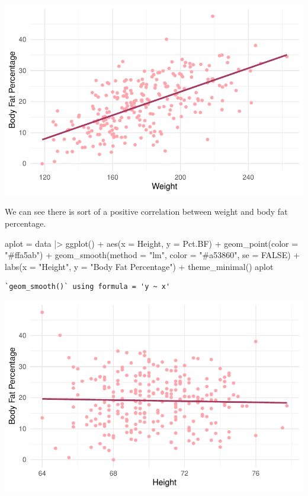\documentclass[
  letterpaper,
  DIV=11,
  numbers=noendperiod]{scrartcl}
\newenvironment{Shaded}{\begin{snugshade}}{\end{snugshade}}
\newcommand{\AttributeTok}[1]{\textcolor[rgb]{0.40,0.45,0.13}{#1}}
\newcommand{\ConstantTok}[1]{\textcolor[rgb]{0.56,0.35,0.01}{#1}}
\newcommand{\FunctionTok}[1]{\textcolor[rgb]{0.28,0.35,0.67}{#1}}
\newcommand{\NormalTok}[1]{\textcolor[rgb]{0.00,0.23,0.31}{#1}}
\newcommand{\OtherTok}[1]{\textcolor[rgb]{0.00,0.23,0.31}{#1}}
\newcommand{\SpecialCharTok}[1]{\textcolor[rgb]{0.37,0.37,0.37}{#1}}
\newcommand{\StringTok}[1]{\textcolor[rgb]{0.13,0.47,0.30}{#1}}
\begin{document}
\includegraphics{Untitled_files/figure-pdf/unnamed-chunk-6-1.pdf}

We can see there is sort of a positive correlation between weight and
body fat percentage.

\begin{Shaded}
\begin{Highlighting}[]
\NormalTok{aplot }\OtherTok{=}\NormalTok{ data }\SpecialCharTok{|\textgreater{}}
  \FunctionTok{ggplot}\NormalTok{() }\SpecialCharTok{+} \FunctionTok{aes}\NormalTok{(}\AttributeTok{x =}\NormalTok{ Height, }\AttributeTok{y =}\NormalTok{ Pct.BF) }\SpecialCharTok{+}
  \FunctionTok{geom\_point}\NormalTok{(}\AttributeTok{color =} \StringTok{"\#ffa5ab"}\NormalTok{) }\SpecialCharTok{+}
  \FunctionTok{geom\_smooth}\NormalTok{(}\AttributeTok{method =} \StringTok{"lm"}\NormalTok{, }\AttributeTok{color =} \StringTok{"\#a53860"}\NormalTok{, }\AttributeTok{se =} \ConstantTok{FALSE}\NormalTok{) }\SpecialCharTok{+}
  \FunctionTok{labs}\NormalTok{(}\AttributeTok{x =} \StringTok{"Height"}\NormalTok{, }\AttributeTok{y =} \StringTok{"Body Fat Percentage"}\NormalTok{) }\SpecialCharTok{+}
  \FunctionTok{theme\_minimal}\NormalTok{()}
\NormalTok{aplot}
\end{Highlighting}
\end{Shaded}

\begin{verbatim}
`geom_smooth()` using formula = 'y ~ x'
\end{verbatim}

\includegraphics{Untitled_files/figure-pdf/unnamed-chunk-7-1.pdf}
\end{document}

